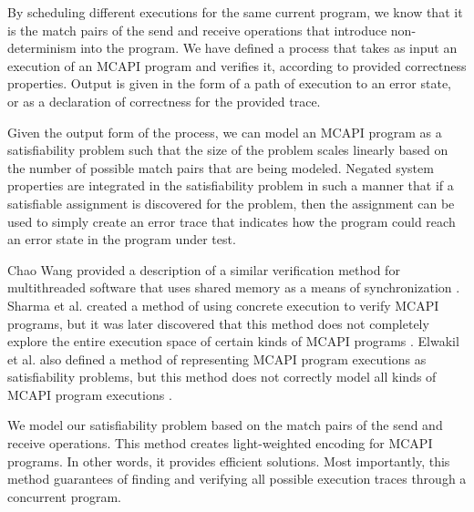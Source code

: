 
By scheduling different executions for the same current program, we know that it is the match pairs of the send and receive operations that
introduce non-determinism into the program. We have defined a process that
takes as input an execution of an MCAPI program and verifies it, according to
provided correctness properties. Output is given in the form of a path of
execution to an error state, or as a declaration of correctness for the
provided trace.

Given the output form of the process, we can model an MCAPI program as a satisfiability problem such that the size of the problem scales linearly
based on the number of possible match pairs that are being modeled. Negated
system properties are integrated in the satisfiability problem in such a manner
that if a satisfiable assignment is discovered for the problem, then the
assignment can be used to simply create an error trace that indicates how the
program could reach an error state in the program under test.


Chao Wang provided a description of a similar verification method for
multithreaded software that uses shared memory as a means of synchronization \cite{wang:fse09}.
Sharma et al. created a method of using concrete execution to verify MCAPI
programs, but it was later discovered that this method does not completely
explore the entire execution space of certain kinds of MCAPI programs \cite{sharma:fmcad09}. Elwakil
et al. also defined a method of representing MCAPI program executions as
satisfiability problems, but this method does not correctly model all kinds of
MCAPI program executions \cite{elwakil:padtad10}
.

We model our satisfiability problem based on the match pairs of the send and receive operations. This method creates light-weighted encoding for MCAPI programs. In other words, it provides efficient solutions. Most importantly, this method guarantees of finding and verifying all possible execution traces through a concurrent program. 


